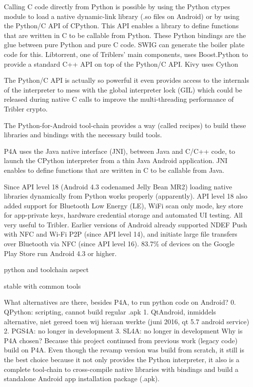 Calling C code directly from Python is possible by using the Python ctypes module to load a native dynamic-link library (.so files on Android) or by using the Python/C API of CPython.
This API enables a library to define functions that are written in C to be callable from Python.
These Python bindings are the glue between pure Python and pure C code.
SWIG can generate the boiler plate code for this.
Libtorrent, one of Triblers' main components, uses Boost.Python to provide a standard C++ API on top of the Python/C API.
Kivy uses Cython

The Python/C API is actually so powerful it even provides access to the internals of the interpreter to mess with the global interpreter lock (GIL) which could be released during native C calls to improve the multi-threading performance of Tribler crypto.

The Python-for-Android tool-chain provides a way (called recipes) to build these libraries and bindings with the necessary build tools.

P4A uses the Java native interface (JNI), between Java and C/C++ code, to launch the CPython interpreter from a thin Java Android application.
JNI enables to define functions that are written in C to be callable from Java.


Since API level 18 (Android 4.3 codenamed Jelly Bean MR2) loading native libraries dynamically from Python works properly (apparently).
API level 18 also added support for Bluetooth Low Energy (LE), WiFi scan only mode, key store for app-private keys, hardware credential storage and automated UI testing.
All very useful to Tribler.
Earlier versions of Android already supported NDEF Push with NFC and Wi-Fi P2P (since API level 14), and initiate large file transfers over Bluetooth via NFC (since API level 16).
83.7\% of devices on the Google Play Store run Android 4.3 or higher.


python and toolchain aspect

stable with common tools


What alternatives are there, besides P4A, to run python code on Android?
0. QPython: scripting, cannot build regular .apk
1. QtAndroid, inmiddels alternative, niet gereed toen wij hieraan werkte (juni 2016, qt 5.7 android service)
2. PGS4A: no longer in development
3. SL4A: no longer in development
Why is P4A chosen?
Because this project continued from previous work (legacy code) build on P4A.
Even though the revamp version was build from scratch, it still is the best choice because it not only provides the Python interpreter, it also is a complete tool-chain to cross-compile native libraries with bindings and build a standalone Android app installation package (.apk).


